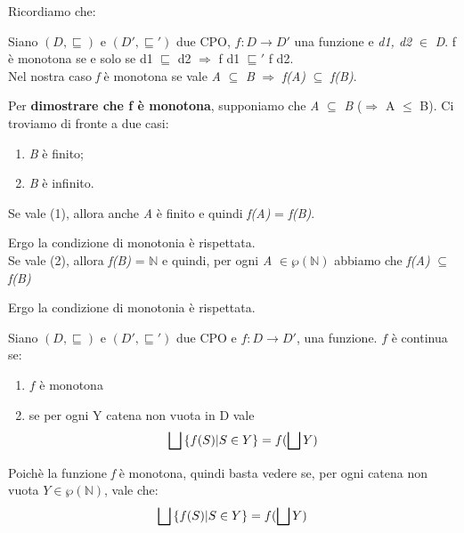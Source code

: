 {
    Ricordiamo che:
    \begin{mydef}
   Siano $(D, \sqsubseteq)$ e $(D', \sqsubseteq{}')$ due CPO, 
   $f:D\rightarrow{}D'$ una funzione e \textit{d1, d2} $\in$ \textit{D}. f è monotona se e solo se d1 $\sqsubseteq$ d2 $\Rightarrow$ f d1 $\sqsubseteq'$ f d2. \\
    Nel nostra caso \textit{f} è monotona se vale \textit{A} $\subseteq$ \textit{B} 
    $\Rightarrow$ \textit{f(A)} $\subseteq$ \textit{f(B)}.
    \end{mydef}

    Per \textbf{dimostrare che f è monotona}, supponiamo che \textit{A} 
    $\subseteq$ \textit{B} ($\Rightarrow$ \textbar A\textbar{} $\leq$ \textbar B\textbar{}). Ci troviamo di fronte a due casi:
    \begin{enumerate}
        \item \textit{B} è finito;
        \item \textit{B} è infinito.
    \end{enumerate}

    Se vale (1), allora anche 
    \textit{A} è finito e quindi \textit{f(A)} = \textit{f(B)}.
    
    Ergo la condizione di monotonia è rispettata.\\

    Se vale (2), allora \textit{f(B)} = $\mathbb{N}$ e quindi, per ogni \textit{A} $\in\wp(\mathbb{N})$ abbiamo che \textit{f(A)} $\subseteq$ \textit{f(B)}

    Ergo la condizione di monotonia è rispettata.\\

    \begin{mydef}
    Siano $(D, \sqsubseteq)$ e $(D', \sqsubseteq{}')$ due CPO e 
    $f:D\rightarrow{}D'$, una funzione. $f$ è continua se:
    \begin{enumerate}
    \item $f$ è monotona
    \item se per ogni Y catena non vuota in D vale
    \[\bigsqcup{} \{f(S) | S \in{}Y\} = f(\bigsqcup{}Y)\]
    \end{enumerate}
    \end{mydef}

    Poichè la funzione \textit{f} è monotona, quindi basta vedere se, per ogni
    catena non vuota $Y\in\wp{(\mathbb{N})}$, vale che:
    \[\bigsqcup{} \{f(S) | S \in{}Y\} = f(\bigsqcup{}Y)\]
    

}
